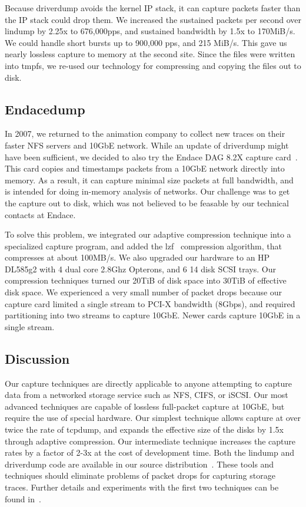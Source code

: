 Because driverdump avoids the kernel IP stack, it can
capture packets faster than the IP stack could drop them.
We increased the sustained packets per second over lindump by 2.25x to
676,000pps, and sustained bandwidth by 1.5x to 170MiB/s.  We could
handle short bursts up to 900,000 pps, and 215 MiB/s.  This gave us
nearly lossless capture to memory at the second site.  Since the files
were written into tmpfs, we re-used our technology for compressing and
copying the files out to disk.

\subsection{Endacedump}

In 2007, we returned to the animation company to collect new traces on
their faster NFS servers and 10GbE network.  While an update of
driverdump might have been sufficient, we decided to also try the
Endace DAG 8.2X capture card~\cite{endace-cards}.  This card copies
and timestamps packets from a 10GbE network directly into memory.  As
a result, it can capture minimal size packets at full bandwidth, and
is intended for doing in-memory analysis of networks.  Our challenge
was to get the capture out to disk, which was not believed to be
feasable by our technical contacts at Endace.

To solve this problem, we integrated our adaptive compression
technique into a specialized capture program, and added the
lzf~\cite{lzf} compression algorithm, that compresses at about
100MB/s.  We also upgraded our hardware to an HP DL585g2 with 4 dual
core 2.8Ghz Opterons, and 6 14 disk SCSI trays.  Our compression
techniques turned our 20TiB of disk space into 30TiB of effective disk
space.  We experienced a very small number of packet drops because our
capture card limited a single stream to PCI-X bandwidth (8Gbps), and
required partitioning into two streams to capture 10GbE.  Newer cards
capture 10GbE in a single stream.

\subsection{Discussion}

Our capture techniques are directly applicable to anyone attempting to
capture data from a networked storage service such as NFS, CIFS, or
iSCSI.  Our most advanced techniques are capable of lossless
full-packet capture at 10GbE, but require the use of special hardware.
Our simplest technique allows capture at over twice the rate of
tcpdump, and expands the effective size of the disks by 1.5x through
adaptive compression. Our intermediate technique increases the capture
rates by a factor of 2-3x at the cost of development time.  Both the
lindump and driverdump code are available in our source
distribution~\cite{DSOpenSource}.  These tools and techniques should
eliminate problems of packet drops for capturing storage traces.
Further details and
experiments with the first two techniques can be found
in~\cite{Anderson06network-tracing}.